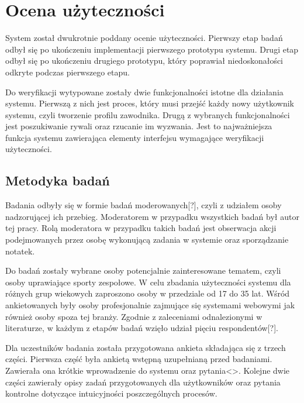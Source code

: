 \chapter{Ocena użyteczności}

System został dwukrotnie poddany ocenie użyteczności. Pierwszy etap badań odbył się po ukończeniu implementacji pierwszego prototypu systemu. Drugi etap odbył się po ukończeniu drugiego prototypu, który poprawiał niedoskonałości odkryte podczas pierwszego etapu. 

Do weryfikacji wytypowane zostały dwie funkcjonalności istotne dla działania systemu. Pierwszą z nich jest proces, który musi przejść każdy nowy użytkownik systemu, czyli tworzenie profilu zawodnika. Drugą z wybranych funkcjonalności jest poszukiwanie rywali oraz rzucanie im wyzwania. Jest to najważniejsza funkcja systemu zawierająca elementy interfejsu wymagające weryfikacji użyteczności.

\section{Metodyka badań}

Badania odbyły się w formie badań moderowanych[?], czyli z udziałem osoby nadzorującej ich przebieg. Moderatorem w przypadku wszystkich badań był autor tej pracy. Rolą moderatora w przypadku takich badań jest obserwacja akcji podejmowanych przez osobę wykonującą zadania w systemie oraz sporządzanie notatek.

Do badań zostały wybrane osoby potencjalnie zainteresowane tematem, czyli osoby uprawiające sporty zespołowe. W celu zbadania użyteczności systemu dla różnych grup wiekowych zaproszono osoby w przedziale od 17 do 35 lat. Wśród ankietowanych były osoby profesjonalnie zajmujące się systemami webowymi jak również osoby spoza tej branży. Zgodnie z zaleceniami odnalezionymi w literaturze, w każdym z etapów badań wzięło udział pięciu respondentów[?].

Dla uczestników badania została przygotowana ankieta składająca się z trzech części. Pierwsza część była ankietą wstępną uzupełnianą przed badaniami. Zawierała ona krótkie wprowadzenie do systemu oraz pytania<>. Kolejne dwie części zawierały opisy zadań przygotowanych dla użytkowników oraz pytania kontrolne dotyczące intuicyjności poszczególnych procesów. 

